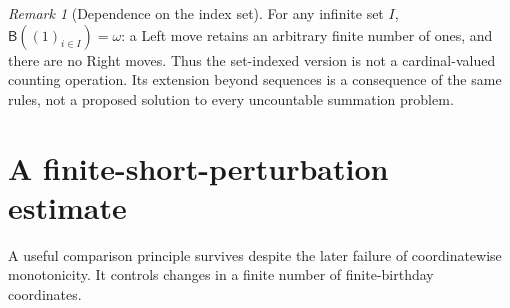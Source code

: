 \documentclass[11pt,letterpaper]{article}
\theoremstyle{definition}
\theoremstyle{remark}
\newtheorem{remark}[theorem]{Remark}
\newcommand{\BB}{\mathsf B}
\begin{document}
\begin{remark}[Dependence on the index set]
For any infinite set $I$, $\BB((1)_{i\in I})=\omega$: a Left move retains an
arbitrary finite number of ones, and there are no Right moves. Thus the
set-indexed version is not a cardinal-valued counting operation. Its extension
beyond sequences is a consequence of the same rules, not a proposed solution
to every uncountable summation problem.
\end{remark}

\section{A finite-short-perturbation estimate}\label{sec:perturbation}

A useful comparison principle survives despite the later failure of
coordinatewise monotonicity. It controls changes in a finite number of
finite-birthday coordinates.
\end{document}
